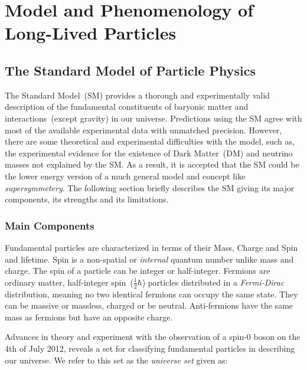 
\chapter{Model and Phenomenology of Long-Lived Particles}
\label{Long_Lived_Particle_physics_chapter}


\section{The Standard Model of Particle Physics}
The Standard Model~(SM) provides a thorough and experimentally valid description of the fundamental constituents of baryonic matter and interactions~(except gravity) in our universe. Predictions using the SM agree with most of the available experimental data with unmatched precision.
However, there are some theoretical and experimental difficulties with the model, such as, the experimental evidence for the existence of Dark Matter~(DM) and neutrino masses not explained by the SM.  As a result, it is accepted that the SM could be the lower energy version of a much general model and concept like \textit{supersymmetery}.
The following section briefly describes the SM giving its major  components, its strengths and its limitations.
\subsection{Main Components}
Fundamental particles are characterized in terms of their Mass, Charge and Spin and lifetime. Spin is a non-spatial or \textit{internal} quantum number unlike mass and charge. The spin of a particle can be integer or half-integer.
Fermions are ordinary matter, half-integer spin~($\frac{1}{2} \hbar$) particles distributed in a \textit{Fermi-Dirac} distribution, meaning no two identical fermions can occupy the same state. They can be massive or massless, charged or be neutral. Anti-fermions have the same mass as fermions but have an opposite charge.

Advances in theory and experiment with the observation of a spin-0 boson on the 4th of July 2012, reveals a set for classifying fundamental particles in describing our universe. We refer to this set as the \textit{universe set} given as:

